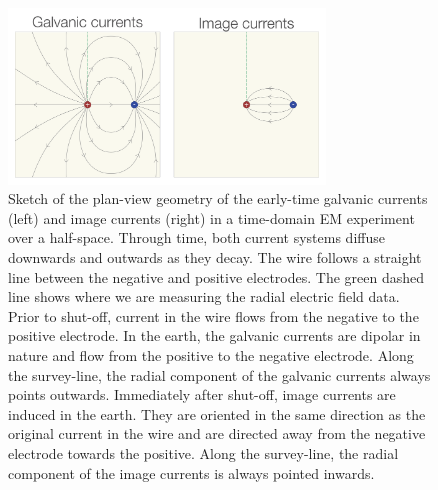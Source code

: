 \begin{figure}
    \begin{center}
    \includegraphics[width=0.75\textwidth]{figures/current-systems-sketch.png}
    \end{center}
\caption{
    Sketch of the plan-view geometry of the early-time galvanic currents (left) and image currents (right) in a time-domain EM experiment over a half-space.
    Through time, both current systems diffuse downwards and outwards as they decay.
    The wire follows a straight line between the negative and positive electrodes. The green dashed line shows where we are measuring the
    radial electric field data. Prior to shut-off, current in the wire flows from
    the negative to the positive electrode. In the earth, the galvanic currents are dipolar in nature and flow
    from the positive to the negative electrode. Along the survey-line, the radial component of the galvanic currents always points outwards.
    Immediately after shut-off, image currents are induced in the earth. They are oriented in the same direction as the original current in the wire
    and are directed away from the negative electrode towards the positive. Along the survey-line, the radial component of the image currents is always pointed inwards.
}
\label{fig:current-systems-sketch}
\end{figure}




